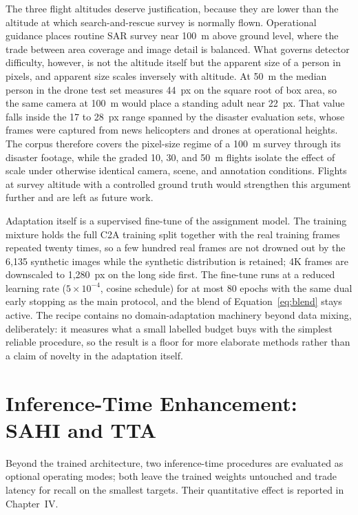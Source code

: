 \documentclass[12pt,a4paper,oneside]{report}
\begin{document}
The three flight altitudes deserve justification, because they are lower than
the altitude at which search-and-rescue survey is normally flown. Operational
guidance places routine SAR survey near 100~m above ground level, where the
trade between area coverage and image detail is balanced. What governs detector
difficulty, however, is not the altitude itself but the apparent size of a
person in pixels, and apparent size scales inversely with altitude. At 50~m the
median person in the drone test set measures 44~px on the square root of box
area, so the same camera at 100~m would place a standing adult near 22~px. That
value falls inside the 17 to 28~px range spanned by the disaster evaluation
sets, whose frames were captured from news helicopters and drones at
operational heights. The corpus therefore covers the pixel-size regime of a
100~m survey through its disaster footage, while the graded 10, 30, and 50~m
flights isolate the effect of scale under otherwise identical camera, scene,
and annotation conditions. Flights at survey altitude with a controlled ground
truth would strengthen this argument further and are left as future work.

Adaptation itself is a supervised fine-tune of the assignment model. The
training mixture holds the full C2A training split together with the real
training frames repeated twenty times, so a few hundred real frames are not
drowned out by the 6{,}135 synthetic images while the synthetic distribution
is retained; 4K frames are downscaled to 1{,}280~px on the long side first.
The fine-tune runs at a reduced learning rate ($5\times10^{-4}$, cosine
schedule) for at most 80 epochs with the same dual early stopping as the main
protocol, and the blend of Equation~\eqref{eq:blend} stays active. The recipe
contains no domain-adaptation machinery beyond data mixing, deliberately: it
measures what a small labelled budget buys with the simplest reliable
procedure, so the result is a floor for more elaborate methods rather than a
claim of novelty in the adaptation itself.

\section{Inference-Time Enhancement: SAHI and TTA}
Beyond the trained architecture, two inference-time procedures are evaluated as
optional operating modes; both leave the trained weights untouched and trade
latency for recall on the smallest targets. Their quantitative effect is
reported in Chapter~IV.
\end{document}
